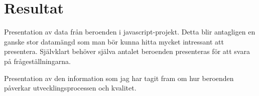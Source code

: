 \section{Resultat}
\label{sec:joel_o-results}
Presentation av data från beroenden i javascript-projekt. Detta blir antagligen en ganske stor datamängd som man bör kunna hitta mycket intressant att presentera. Självklart behöver själva antalet beroenden presenteras för att svara på frågeställningarna.

Presentation av den information som jag har tagit fram om hur beroenden påverkar utvecklingsprocessen och kvalitet.
